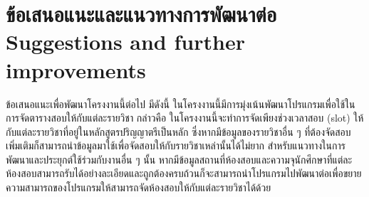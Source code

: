 \section{\ifcpe%
ข้อเสนอแนะและแนวทางการพัฒนาต่อ
\else%
Suggestions and further improvements
\fi
}

ข้อเสนอแนะเพื่อพัฒนาโครงงานนี้ต่อไป มีดังนี้
ในโครงงานนี้มีการมุ่งเน้นพัฒนาโปรแกรมเพื่อใช้ในการจัดตารางสอบให้กับแต่ละรายวิชา กล่าวคือ ในโครงงานนี้จะทำการจัดเพียงช่วงเวลาสอบ (slot) ให้กับแต่ละรายวิชาที่อยู่ในหลักสูตรปริญญาตรีเป็นหลัก ซึ่งหากมีข้อมูลของรายวิชาอื่น ๆ ที่ต้องจัดสอบเพิ่มเติมก็สามารถนำข้อมูลมาใช้เพื่อจัดสอบให้กับรายวิชาเหล่านั้นได้ไม่ยาก
สำหรับแนวทางในการพัฒนาและประยุกต์ใช้ร่วมกับงานอื่น ๆ นั้น หากมีข้อมูลสถานที่ห้องสอบและความจุนักศึกษาที่แต่ละห้องสอบสามารถรับได้อย่างละเอียดและถูกต้องครบถ้วนก็จะสามารถนำโปรแกรมไปพัฒนาต่อเพื่อขยายความสามารถของโปรแกรมให้สามารถจัดห้องสอบให้กับแต่ละรายวิชาได้ด้วย

